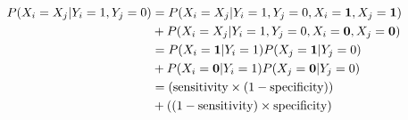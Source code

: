 \documentclass[12pt]{article}
\begin{document}
\begin{align*}
P(X_{i} = X_{j} | Y_{i} = 1, Y_{j} = 0) &= P(X_{i} = X_{j} | Y_{i} = 1, Y_{j} = 0, X_{i} = {\bf 1}, X_{j} = {\bf 1}) \\
&+ P(X_{i} = X_{j} | Y_{i} = 1, Y_{j} = 0, X_{i} = {\bf 0}, X_{j} = {\bf 0}) \\
&= P(X_{i} = {\bf 1} | Y_{i} = 1) P(X_{j} = {\bf 1} | Y_{j} = 0) \\
&+ P(X_{i} = {\bf 0} | Y_{i} = 1) P(X_{j} = {\bf 0} | Y_{j} = 0) \\
&= \left(\text{sensitivity} \times (1 - \text{specificity})\right) \\
&+ \left((1- \text{sensitivity}) \times \text{specificity}\right)
\end{align*}





\end{document}
